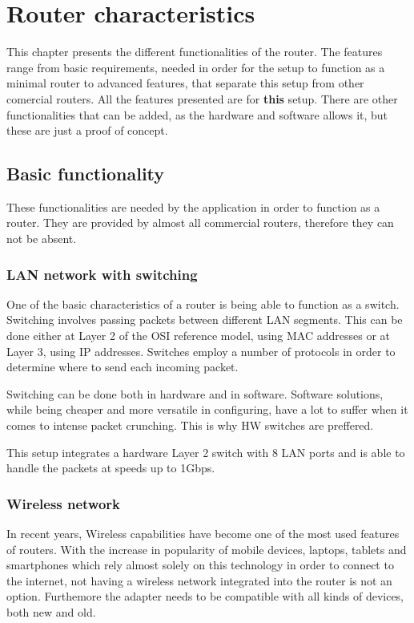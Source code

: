 \chapter{Router characteristics}
\label{chapter:characteristics}

This chapter presents the different functionalities of the router.
The features range from basic requirements, needed in order
for the setup to function as a minimal router to advanced features,
that separate this setup from other comercial routers.
All the features presented are for \textbf{this} setup.
There are other functionalities that can be added, as the hardware
and software allows it, but these are just a proof of concept.

\section{Basic functionality}
These functionalities are needed by the application in order to function
as a router. They are provided by almost all commercial routers,
therefore they can not be absent.

\subsection{LAN network with switching}
\label{sub-sec:lan-switching}
One of the basic characteristics of a router is being able to function as
a switch. Switching involves passing packets between different LAN segments.
This can be done either at Layer 2 of the OSI reference model, using MAC
addresses or at Layer 3, using IP addresses. Switches employ a number of
protocols in order to determine where to send each incoming packet.

Switching can be done both in hardware and in software.
Software solutions, while being cheaper and more versatile
in configuring, have a lot to suffer when it comes to intense 
packet crunching. This is why HW switches are preffered.

This setup integrates a hardware Layer 2 switch with 8 LAN ports 
and is able to handle the packets at speeds up to 1Gbps.

\subsection{Wireless network}
\label{sub-sec:wireless}
In recent years, Wireless capabilities have become one of the most
used features of routers. With the increase in popularity of mobile devices, laptops,
tablets and smartphones which rely almost solely on this technology in order to connect
to the internet, not having a wireless network integrated into the router
is not an option. Furthemore the adapter needs to be compatible with 
all kinds of devices, both new and old.

